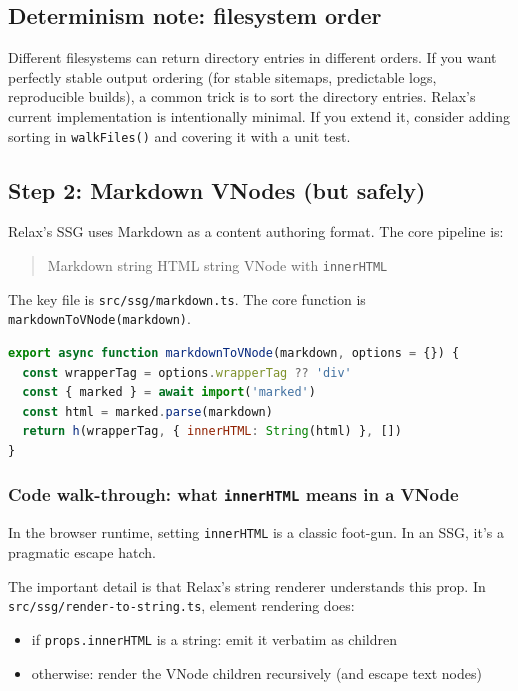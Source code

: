 \subsection{Determinism note: filesystem order}
Different filesystems can return directory entries in different orders.
If you want perfectly stable output ordering (for stable sitemaps, predictable logs, reproducible builds), a common trick is to sort the directory entries.
Relax's current implementation is intentionally minimal.
If you extend it, consider adding sorting in \texttt{walkFiles()} and covering it with a unit test.

\subsection{Step 2: Markdown \textrightarrow VNodes (but safely)}
Relax's SSG uses Markdown as a content authoring format.
The core pipeline is:

\begin{quote}
Markdown string \textrightarrow HTML string \textrightarrow VNode with \texttt{innerHTML}
\end{quote}

The key file is \texttt{src/ssg/markdown.ts}.
The core function is \texttt{markdownToVNode(markdown)}.

\begin{lstlisting}[style=relax,language=JavaScript,caption={Markdown to VNode uses \texttt{innerHTML} (from \texttt{src/ssg/markdown.ts}).}]
export async function markdownToVNode(markdown, options = {}) {
  const wrapperTag = options.wrapperTag ?? 'div'
  const { marked } = await import('marked')
  const html = marked.parse(markdown)
  return h(wrapperTag, { innerHTML: String(html) }, [])
}
\end{lstlisting}

\subsubsection{Code walk-through: what \texttt{innerHTML} means in a VNode}
In the browser runtime, setting \texttt{innerHTML} is a classic foot-gun.
In an SSG, it's a pragmatic escape hatch.

The important detail is that Relax's string renderer understands this prop.
In \texttt{src/ssg/render-to-string.ts}, element rendering does:

\begin{itemize}
  \item if \texttt{props.innerHTML} is a string: emit it verbatim as children
  \item otherwise: render the VNode children recursively (and escape text nodes)
\end{itemize}

